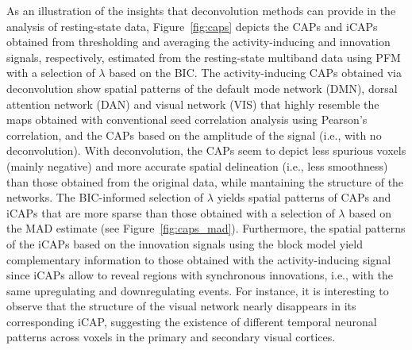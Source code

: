 As an illustration of the insights that deconvolution methods can provide in the
analysis of resting-state data, Figure~\ref{fig:caps} depicts the CAPs and iCAPs
obtained from thresholding and averaging the activity-inducing and innovation
signals, respectively, estimated from the resting-state multiband data using PFM
with a selection of $\lambda$ based on the BIC. The activity-inducing CAPs
obtained via deconvolution show spatial patterns of the default mode network
(DMN), dorsal attention network (DAN) and visual network (VIS) that highly
resemble the maps obtained with conventional seed correlation analysis using
Pearson's correlation, and the CAPs based on the amplitude of the signal (i.e.,
with no deconvolution). With deconvolution, the CAPs seem to depict less
spurious voxels (mainly negative) and more accurate spatial delineation (i.e.,
less smoothness) than those obtained from the original data, while mantaining
the structure of the networks. The BIC-informed selection of $\lambda$ yields
spatial patterns of CAPs and iCAPs that are more sparse than those obtained with
a selection of $\lambda$ based on the MAD estimate (see
Figure~\ref{fig:caps_mad}). Furthermore, the spatial patterns of the iCAPs based
on the innovation signals using the block model yield complementary information
to those obtained with the activity-inducing signal since iCAPs allow to reveal
regions with synchronous innovations, i.e., with the same upregulating and
downregulating events. For instance, it is interesting to observe that the
structure of the visual network nearly disappears in its corresponding iCAP,
suggesting the existence of different temporal neuronal patterns across voxels
in the primary and secondary visual cortices. 

